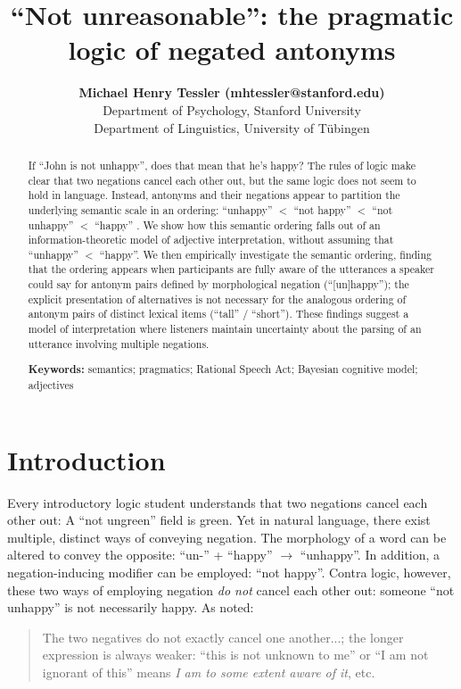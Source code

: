 \documentclass[10pt,letterpaper]{article}
\title{``Not unreasonable'': the pragmatic logic of negated antonyms}
\author{{\large \bf Michael Henry Tessler (mhtessler@stanford.edu)} \\
  Department of Psychology, Stanford University 
  \AND {\large \bf Michael Franke (mchfranke@gmail.com)} \\
  Department of Linguistics, University of T\"{u}bingen}
\begin{document}
\maketitle


\begin{abstract}

If ``John is not unhappy'', does that mean that he's happy? 
The rules of logic make clear that two negations cancel each other out, but the same logic does not seem to hold in language. 
Instead, antonyms and their negations appear to partition the underlying semantic scale in an ordering: ``unhappy'' $<$ ``not happy'' $<$ ``not unhappy'' $<$ ``happy'' \cite{Horn1989:Natural, Krifka2007:Negated-antonyms}. 
We show how this semantic ordering falls out of an information-theoretic model of adjective interpretation, without assuming that ``unhappy'' $<$ ``happy''.
We then empirically investigate the semantic ordering, finding that the ordering appears when participants are fully aware of the utterances a speaker could say for antonym pairs defined by morphological negation (``[un]happy''); the explicit presentation of alternatives is not necessary for the analogous ordering of antonym pairs of distinct lexical items (``tall'' / ``short''). 
These findings suggest a model of interpretation where listeners maintain uncertainty about the parsing of an utterance involving multiple negations.


\textbf{Keywords:} 
semantics; pragmatics; Rational Speech Act; Bayesian cognitive model; adjectives
\end{abstract}


\section{Introduction}

Every introductory logic student understands that two negations cancel each other out: A ``not ungreen'' field is green.
Yet in natural language, there exist multiple, distinct ways of conveying negation.  
The morphology of a word can be altered to convey the opposite: ``un-'' + ``happy'' $\rightarrow$ ``unhappy''.
In addition, a negation-inducing modifier can be employed: ``not happy''.
Contra logic, however, these two ways of employing negation \emph{do not} cancel each other out: someone ``not unhappy'' is not necessarily happy. 	
As  noted:
%
\begin{quote}
The two negatives do not exactly cancel one another...; the longer expression is always weaker: ``this is not unknown to me'' or ``I am not ignorant of this'' means \emph{I am to some extent aware of it}, etc.
\end{quote}
%
\end{document}
